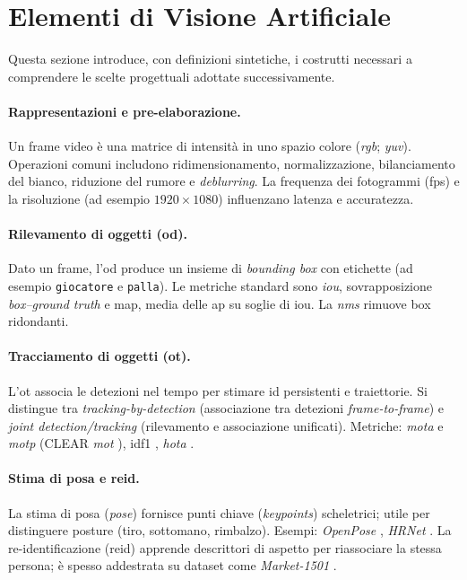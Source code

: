 \documentclass[12pt,a4paper,openright,twoside]{book}
\begin{document}
\section{Elementi di Visione Artificiale}
\label{sec:elementi-visione-artificiale}

Questa sezione introduce, con definizioni sintetiche, i costrutti 
necessari a comprendere le scelte progettuali adottate 
successivamente.

\paragraph{Rappresentazioni e pre-elaborazione.} Un frame video è una 
matrice di intensità in uno spazio colore (\emph{\ac{rgb}}; 
\emph{\ac{yuv}}). Operazioni comuni includono ridimensionamento, 
normalizzazione, bilanciamento del bianco, riduzione del rumore 
e \emph{deblurring}. La frequenza dei fotogrammi (\ac{fps}) 
e la risoluzione (ad esempio $1920\times1080$) influenzano 
latenza e accuratezza.

\paragraph{Rilevamento di oggetti (\ac{od}).} Dato un frame, l'\ac{od} 
produce un insieme di \emph{bounding box} con etichette (ad esempio 
\texttt{giocatore} e \texttt{palla}). Le metriche standard sono \emph{\ac{iou}},
sovrapposizione \emph{box--ground truth} e \ac{map}, media delle 
\ac{ap} su soglie di \ac{iou}. La \emph{\ac{nms}} rimuove box ridondanti.

\paragraph{Tracciamento di oggetti (\ac{ot}).} 
L'\ac{ot} associa le detezioni nel tempo per stimare 
\ac{id} persistenti e traiettorie. Si distingue tra 
\emph{tracking-by-detection} (associazione 
tra detezioni \emph{frame-to-frame}) e 
\emph{joint detection/tracking} 
(rilevamento e associazione unificati). 
Metriche: \emph{\ac{mota}} e \emph{\ac{motp}} 
(CLEAR \emph{\ac{mot}} \cite{Bernardin2008CLEAR}), 
\ac{idf1} \cite{Ristani2016Performance}, \emph{\ac{hota}} 
\cite{Luiten2020HOTA}.

\paragraph{Stima di posa e \ac{reid}.} La stima di posa (\emph{pose}) 
fornisce punti chiave (\emph{keypoints}) scheletrici; utile per 
distinguere posture (tiro, sottomano, rimbalzo).
Esempi: \emph{OpenPose} \cite{8765346}, \emph{HRNet} \cite{Sun2019Deep}.
La re-identificazione (\ac{reid}) apprende descrittori di aspetto 
per riassociare la stessa persona; è spesso addestrata su dataset 
come \emph{Market-1501} \cite{7410490}.
\end{document}
